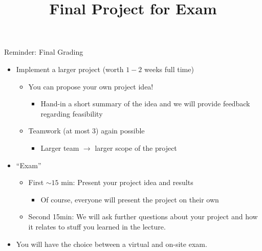 \documentclass[aspectratio=169]{../latex_main/tntbeamer}  %
\title[RL: Exam]{Final Project for Exam}
\begin{document}
	
	\maketitle

\begin{frame}[c]{Reminder: Final Grading}
	
	\begin{itemize}
		\item Implement a larger project (worth $1-2$ weeks full time)
		\begin{itemize}
			\item You can propose your own project idea!
			\begin{itemize}
				\item Hand-in a short summary of the idea and we will provide feedback regarding feasibility
			\end{itemize}
			\item Teamwork (at most 3) again possible
			\begin{itemize}
				\item Larger team $\to$ larger scope of the project
			\end{itemize}
		\end{itemize}
		\item ``Exam''
		\begin{itemize}
			\item First $\sim 15$ min: Present your project idea and results 
			\begin{itemize}
				\item Of course, everyone will present the project on their own
			\end{itemize}
			\item Second 15min: We will ask further questions about your project and how it relates to stuff you learned in the lecture.
		\end{itemize}	
		\item You will have the choice between a virtual and on-site exam.
	\end{itemize}
	
\end{frame}
\end{document}
